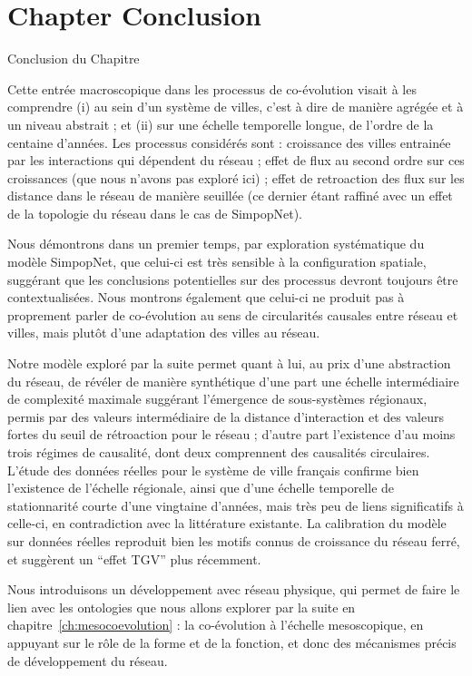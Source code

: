 

\newpage


\section*{Chapter Conclusion}{Conclusion du Chapitre}


Cette entrée macroscopique dans les processus de co-évolution visait à les comprendre (i) au sein d'un système de villes, c'est à dire de manière agrégée et à un niveau abstrait ; et (ii) sur une échelle temporelle longue, de l'ordre de la centaine d'années. Les processus considérés sont : croissance des villes entrainée par les interactions qui dépendent du réseau ; effet de flux au second ordre sur ces croissances (que nous n'avons pas exploré ici) ; effet de retroaction des flux sur les distance dans le réseau de manière seuillée (ce dernier étant raffiné avec un effet de la topologie du réseau dans le cas de SimpopNet).


Nous démontrons dans un premier temps, par exploration systématique du modèle SimpopNet, que celui-ci est très sensible à la configuration spatiale, suggérant que les conclusions potentielles sur des processus devront toujours être contextualisées. Nous montrons également que celui-ci ne produit pas à proprement parler de co-évolution au sens de circularités causales entre réseau et villes, mais plutôt d'une adaptation des villes au réseau.


Notre modèle exploré par la suite permet quant à lui, au prix d'une abstraction du réseau, de révéler de manière synthétique d'une part une échelle intermédiaire de complexité maximale suggérant l'émergence de sous-systèmes régionaux, permis par des valeurs intermédiaire de la distance d'interaction et des valeurs fortes du seuil de rétroaction pour le réseau ; d'autre part l'existence d'au moins trois régimes de causalité, dont deux comprennent des causalités circulaires. L'étude des données réelles pour le système de ville français confirme bien l'existence de l'échelle régionale, ainsi que d'une échelle temporelle de stationnarité courte d'une vingtaine d'années, mais très peu de liens significatifs à celle-ci, en contradiction avec la littérature existante. La calibration du modèle sur données réelles reproduit bien les motifs connus de croissance du réseau ferré, et suggèrent un ``effet TGV'' plus récemment.


Nous introduisons un développement avec réseau physique, qui permet de faire le lien avec les ontologies que nous allons explorer par la suite en chapitre~\ref{ch:mesocoevolution} : la co-évolution à l'échelle mesoscopique, en appuyant sur le rôle de la forme et de la fonction, et donc des mécanismes précis de développement du réseau.



\stars
